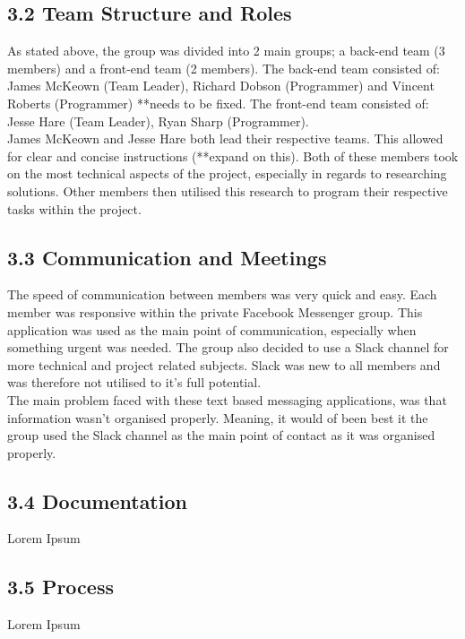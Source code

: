 \documentclass[11pt]{article}
\begin{document}
\subsection{3.2 Team Structure and Roles}
As stated above, the group was divided into 2 main groups;  a back-end team (3 members) and a front-end team (2 members). The back-end team consisted of: James McKeown (Team Leader), Richard Dobson (Programmer) and Vincent Roberts (Programmer) **needs to be fixed. The front-end team consisted of: Jesse Hare (Team Leader), Ryan Sharp (Programmer). \\

James McKeown and Jesse Hare both lead their respective teams. This allowed for clear and concise instructions (**expand on this). Both of these members took on the most technical aspects of the project, especially in regards to researching solutions. Other members then utilised this research to program their respective tasks within the project. \\


\subsection{3.3 Communication and Meetings}
The speed of communication between members was very quick and easy. Each member was responsive within the private Facebook Messenger group. This application was used as the main point of communication, especially when something urgent was needed. The group also decided to use a Slack channel for more technical and project related subjects. Slack was new to all members and was therefore not utilised to it's full potential. \\

The main problem faced with these text based messaging applications, was that information wasn't organised properly. Meaning, it would of been best it the group used the Slack channel as the main point of contact as it was organised properly. \\

\subsection{3.4 Documentation}
Lorem Ipsum

\subsection{3.5 Process}
Lorem Ipsum


\end{document}
